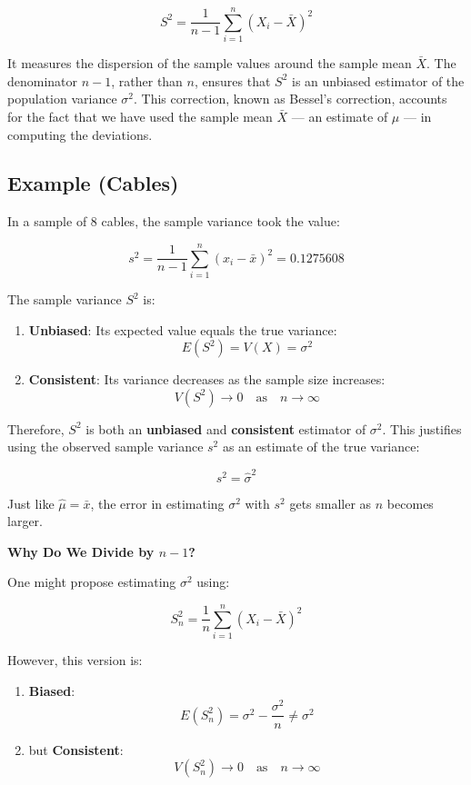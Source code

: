 \documentclass[
]{book}
\providecommand{\tightlist}{%
  \setlength{\itemsep}{0pt}\setlength{\parskip}{0pt}}
\begin{document}
\[
S^2 = \frac{1}{n - 1} \sum_{i=1}^n (X_i - \bar{X})^2
\]

It measures the dispersion of the sample values around the sample mean \(\bar{X}\). The denominator \(n - 1\), rather than \(n\), ensures that \(S^2\) is an unbiased estimator of the population variance \(\sigma^2\). This correction, known as Bessel's correction, accounts for the fact that we have used the sample mean \(\bar{X}\) --- an estimate of \(\mu\) --- in computing the deviations.

\hypertarget{example-cables-1}{%
\subsection{Example (Cables)}\label{example-cables-1}}

In a sample of \(8\) cables, the sample variance took the value:

\[
s^2 = \frac{1}{n - 1} \sum_{i=1}^n (x_i - \bar{x})^2 = 0.1275608
\]

The sample variance \(S^2\) is:

\begin{enumerate}
\def\labelenumi{\arabic{enumi}.}
\tightlist
\item
  \textbf{Unbiased}: Its expected value equals the true variance:\\
  \[
  E(S^2) = V(X) = \sigma^2
  \]
\item
  \textbf{Consistent}: Its variance decreases as the sample size increases:\\
  \[
  V(S^2) \to 0 \quad \text{as} \quad n \to \infty
  \]
\end{enumerate}

Therefore, \(S^2\) is both an \textbf{unbiased} and \textbf{consistent} estimator of \(\sigma^2\). This justifies using the observed sample variance \(s^2\) as an estimate of the true variance:

\[
s^2 = \hat{\sigma}^2
\]

Just like \(\hat{\mu} = \bar{x}\), the error in estimating \(\sigma^2\) with \(s^2\) gets smaller as \(n\) becomes larger.

\textbf{Why Do We Divide by \(n - 1\)?}

One might propose estimating \(\sigma^2\) using:

\[
S_n^2 = \frac{1}{n} \sum_{i=1}^n (X_i - \bar{X})^2
\]

However, this version is:

\begin{enumerate}
\def\labelenumi{\arabic{enumi}.}
\tightlist
\item
  \textbf{Biased}:\\
  \[
  E(S_n^2) = \sigma^2 - \frac{\sigma^2}{n} \neq \sigma^2
  \]
\item
  but \textbf{Consistent}:\\
  \[
  V(S_n^2) \to 0 \quad \text{as} \quad n \to \infty
  \]
\end{enumerate}
\end{document}
